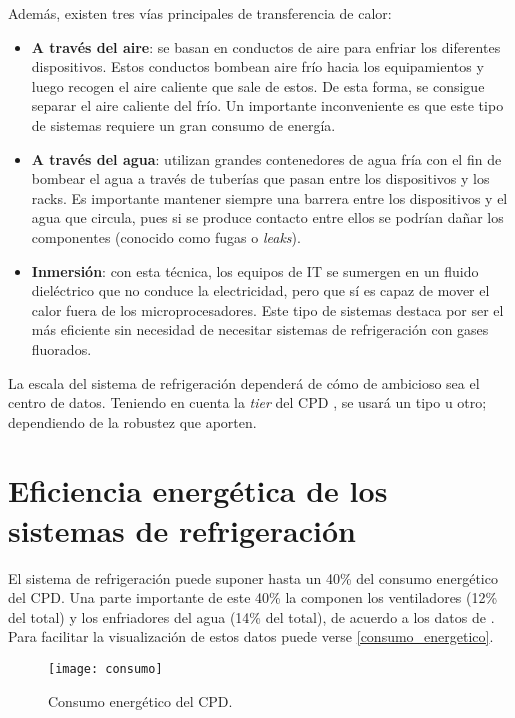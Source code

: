 Además, existen tres vías principales de transferencia de calor:

\begin{itemize}
    \item \textbf{A través del aire}: se basan en conductos de aire para enfriar los diferentes dispositivos. Estos conductos bombean aire frío hacia los equipamientos y luego recogen el aire caliente que sale de estos. De esta forma, se consigue separar el aire caliente del frío. Un importante inconveniente es que este tipo de sistemas requiere un gran consumo de energía.
    \item \textbf{A través del agua}: utilizan grandes contenedores de agua fría con el fin de bombear el agua a través de tuberías que pasan entre los dispositivos y los racks. Es importante mantener siempre una barrera entre los dispositivos y el agua que circula, pues si se produce contacto entre ellos se podrían dañar los componentes (conocido como fugas o \textit{leaks}).
    \item \textbf{Inmersión}: con esta técnica, los equipos de IT se sumergen en un fluido dieléctrico que no conduce la electricidad, pero que sí es capaz de mover el calor fuera de los microprocesadores. Este tipo de sistemas destaca por ser el más eficiente sin necesidad de necesitar sistemas de refrigeración con gases fluorados.
\end{itemize}

La escala del sistema de refrigeración dependerá de cómo de ambicioso sea el centro de datos. Teniendo en cuenta la \textit{tier} del CPD \cite{cofrico}, se usará un tipo u otro; dependiendo de la robustez que aporten.

\section{Eficiencia energética de los sistemas de refrigeración}

El sistema de refrigeración puede suponer hasta un 40\% del consumo energético del CPD. Una parte importante de este 40\% la componen los ventiladores (12\% del total) y los enfriadores del agua (14\% del total), de acuerdo a los datos de \cite{ZHANG2021102253}. Para facilitar la visualización de estos datos puede verse \eqref{consumo_energetico}.

\begin{figure}
    \begin{center}
        \texttt{[image: consumo]}
        \caption{Consumo energético del CPD.}
        \label{consumo_energetico}
    \end{center}
\end{figure}

